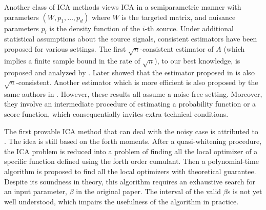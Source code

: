 \documentclass[twoside]{article}
\theoremstyle{definition}
\begin{document}
Another class of ICA methods views ICA in a semiparametric manner with parameters $(W, p_1, \ldots, p_d)$ where $W$ is the targeted matrix, and nuisance parameters $p_i$ is the density function of the $i$-th source. 
Under additional statistical assumptions about the source signals, consistent estimators have been proposed for various settings. The first  $\sqrt{n}$-consistent estimator of $A$ (which implies a finite sample bound in the rate of $\sqrt{n}$), to our best knowledge, is proposed and analyzed by \citet{samarov2004nonparametric}.  
Later \citet{chen2005consistent} showed that the estimator proposed in \citet{eriksson2003characteristic} is also $\sqrt{n}$-consistent. Another estimator which is more efficient is also proposed by the same authors in \citep{chen2006efficient}.
However, these results all assume a noise-free setting. 
Moreover, they involve an intermediate procedure of estimating a probability function or a score function, which consequentially invites extra technical conditions. 

The first provable ICA method that can deal with the noisy case is attributed to \citet{arora2012provable}. 
The idea is still based on the forth moments. 
After a quasi-whitening procedure, the ICA problem is reduced into a problem of finding all the local optimizer of a specific function defined using the forth order cumulant. Then a polynomial-time algorithm is proposed to find all the local optimizers with theoretical guarantee.
Despite its soundness in theory, this algorithm requires an exhaustive search for an input parameter, $\beta$ in the original paper.
The interval of the valid $\beta$s is not yet well understood, which impairs the usefulness of the algorithm in practice.
\end{document}
